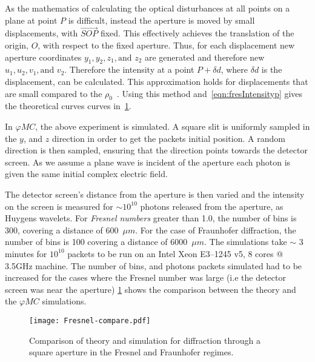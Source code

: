 \medskip

As the mathematics of calculating the optical disturbances at all points on a plane at point $P$ is difficult, instead the aperture is moved by small displacements, with $\overrightarrow{SOP}$ fixed.
This effectively achieves the translation of the origin, $O$, with respect to the fixed aperture. 
Thus, for each displacement new aperture coordinates $y_1, y_2, z_1, \text{and } z_2$ are generated and therefore new $u_1, u_2, v_1, \text{and }v_2$.
Therefore the intensity at a point $P +\delta d$, where $\delta d$ is the displacement, can be calculated.
This approximation holds for displacements that are small compared to the $\rho_0$~\cite{born2000principles,hecht2017optics,goodman2017introduction}.
Using this method and~\cref{eqn:fresIntensityp} gives the theoretical curves curves in~\cref{fig:frescompare}.

\medskip

In $\varphi MC$, the above experiment is simulated. 
A square slit is uniformly sampled in the $y$, and $z$ direction in order to get the packets initial position. 
A random direction is then sampled, ensuring that the direction points towards the detector screen.
As we assume a plane wave is incident of the aperture each photon is given the same initial complex electric field.

The detector screen's distance from the aperture is then varied and the intensity on the screen is measured for $\sim 10^{10}$ photons released from the aperture, as Huygens wavelets.
For \textit{Fresnel numbers} greater than 1.0, the number of bins is 300, covering a distance of 600~$\mu m$. 
For the case of Fraunhofer diffraction, the number of bins is 100 covering a distance of 6000~$\mu m$.
The simulations take $\sim$ 3 minutes for $10^{10}$ packets to be run on an Intel Xeon E3--1245 v5, 8 cores @ 3.5GHz machine.
The number of bins, and photons packets simulated had to be increased for the cases where the Fresnel number was large (i.e the detector screen was near the aperture)
\cref{fig:frescompare} shows the comparison between the theory and the $\varphi MC$ simulations.

\begin{figure}[!ht]
    \centering
    \texttt{[image: Fresnel-compare.pdf]}
    \caption{Comparison of theory and simulation for diffraction through a square aperture in the Fresnel and Fraunhofer regimes.}
    \label{fig:frescompare}
\end{figure}

